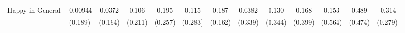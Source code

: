 {\begin{tabular}{l*{12}{c}}
\addlinespace
Happy in General&    -0.00944         &      0.0372         &       0.106         &       0.195         &       0.115         &       0.187         &      0.0382         &       0.130         &       0.168         &       0.153         &       0.489         &      -0.314         \\
            &     (0.189)         &     (0.194)         &     (0.211)         &     (0.257)         &     (0.283)         &     (0.162)         &     (0.339)         &     (0.344)         &     (0.399)         &     (0.564)         &     (0.474)         &     (0.279)         \\
\bottomrule
\end{tabular}
}
